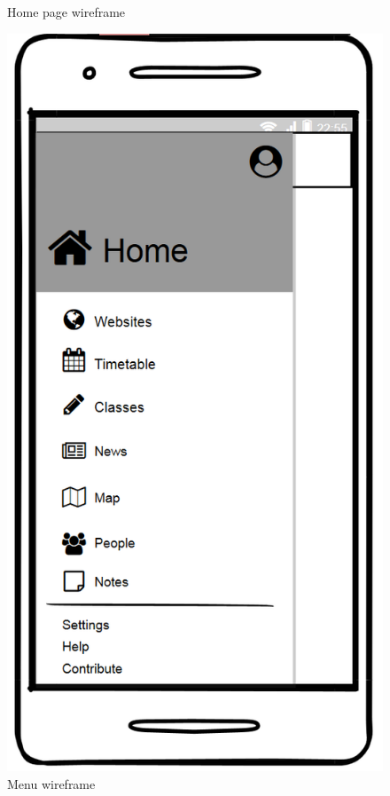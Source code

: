 \begin{figure}[!ht]
\begin{minipage}[b]{0.26\textwidth}
        \caption{Home page wireframe}
        \label{4:fig:balsamiq_home}
    \end{minipage}
    \hfill
    \begin{minipage}[b]{0.26\textwidth}
        \captionsetup{justification=centering}
        \includegraphics[width=\textwidth]{figures/app/balsamiq/drawer.png}
        \caption{Menu wireframe}
        \label{4:fig:balsamiq_menu}
    \end{minipage}
\end{figure}

